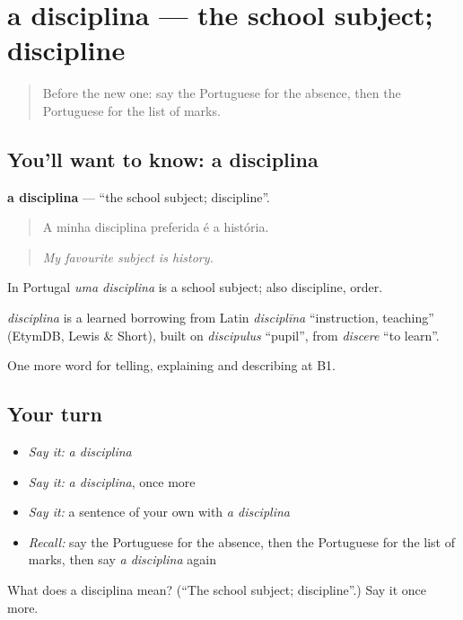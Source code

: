 \section[a disciplina]{a disciplina — the school subject; discipline}

\label{lesson:PT-C375-disciplina}



\begin{quote}
Before the new one: say the Portuguese for the absence, then the Portuguese for the list of marks.
\end{quote}

\subsection*{You'll want to know: a disciplina}
\textbf{a disciplina} — \textquotedblleft{}the school subject; discipline\textquotedblright{}.

\begin{quote}
A minha disciplina preferida é a história.
\end{quote}

\begin{quote}
\emph{My favourite subject is history.}
\end{quote}

In Portugal \emph{uma disciplina} is a school subject; also discipline, order.

\begin{cousinweb}
\emph{disciplina} is a learned borrowing from Latin \emph{disciplīna} \textquotedblleft{}instruction, teaching\textquotedblright{} (EtymDB, Lewis \& Short), built on \emph{discipulus} \textquotedblleft{}pupil\textquotedblright{}, from \emph{discere} \textquotedblleft{}to learn\textquotedblright{}.
\end{cousinweb}

\begin{grammarlens}[title={What you've built}]
One more word for telling, explaining and describing at B1.
\end{grammarlens}

\subsection*{Your turn}
\begin{itemize}
\raggedright
  \item \emph{Say it:} \emph{a disciplina}
  \item \emph{Say it:} \emph{a disciplina}, once more
  \item \emph{Say it:} a sentence of your own with \emph{a disciplina}
  \item \emph{Recall:} say the Portuguese for the absence, then the Portuguese for the list of marks, then say \emph{a disciplina} again
\end{itemize}

\begin{tcolorbox}[breakable,colback=teal!4,colframe=teal!35!black,title={Before you move on}]
What does a disciplina mean? (\textquotedblleft{}The school subject; discipline\textquotedblright{}.) Say it once more.
\end{tcolorbox}

